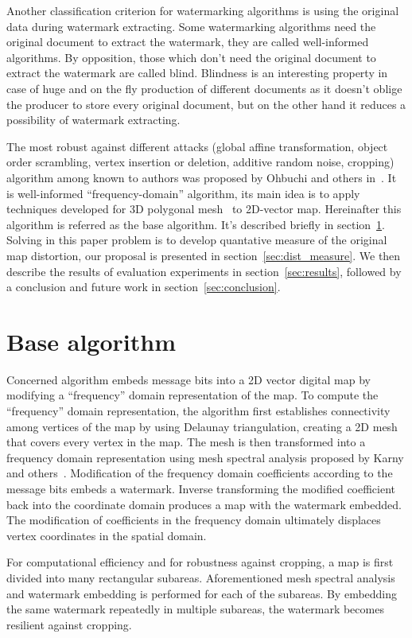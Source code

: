 \documentclass{article}
\begin{document}
Another classification criterion for watermarking algorithms is using the original data during watermark extracting. Some watermarking algorithms need the original document to extract the watermark, 
they are called well-informed algorithms. By opposition, those which don’t need the original document to extract the watermark are called blind.
Blindness is an interesting property in case of huge and on the fly production of different documents as it doesn't oblige the producer to store every original document, 
but on the other hand it reduces a possibility of watermark extracting.

The most robust against different attacks (global affine transformation, object order scrambling, vertex insertion or deletion, additive random noise, cropping) algorithm among known to authors 
was proposed by Ohbuchi and others in~\cite{Ohbuchi}. It is well-informed ``frequency-domain'' algorithm, its main idea is to apply techniques developed for 3D polygonal mesh~\cite{Ohbuchi3D} to 2D-vector map. 
Hereinafter this algorithm is referred as the base algorithm. It's described briefly in section~\ref{sec:base}. Solving in this paper problem is to develop quantative measure of the original map distortion, 
our proposal is presented in section~\ref{sec:dist_measure}. We then describe the results of evaluation experiments in section~\ref{sec:results}, 
followed by a conclusion and future work in section~\ref{sec:conclusion}.

\section{Base algorithm}
\label{sec:base}
Concerned algorithm embeds message bits into a 2D vector digital map by modifying a ``frequency'' domain representation of the map. 
To compute the ``frequency'' domain representation, the algorithm first establishes connectivity among vertices of the map by using Delaunay triangulation, creating a 2D mesh that covers every vertex in the map.
The mesh is then transformed into a frequency domain representation using mesh spectral analysis proposed by Karny and others~\cite{Karni1, Karni2}. Modification of the frequency domain coefficients 
according to the message bits embeds a watermark. Inverse transforming the modified coefficient back into the coordinate domain produces a map with the watermark embedded. The modification of coefficients in the
frequency domain ultimately displaces vertex coordinates in the spatial domain.

For computational efficiency and for robustness against cropping, a map is first divided into many rectangular subareas. Aforementioned mesh spectral analysis and watermark embedding is performed 
for each of the subareas. By embedding the same watermark repeatedly in multiple subareas, the watermark becomes resilient against cropping.
\end{document}
